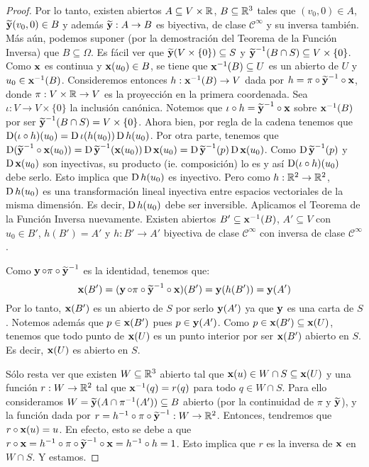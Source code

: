 \begin{prop}
\begin{proof}
Por lo tanto, existen abiertos $A\subseteq V\times\RR$, $B\subseteq\RR^3$ tales que $(v_0,0)\in A$, $\widetilde{\y}(v_0,0)\in B$ y además $\widetilde{\y}:A\to B$ es biyectiva, de clase $\mathscr{C}^\infty$ y su inversa también. Más aún, podemos suponer (por la demostración del Teorema de la Función Inversa) que $B\subseteq\Omega$. Es fácil ver que $\widetilde{\y}(V\times\{0\}) \subseteq S$ y $\widetilde{\y}^{-1}(B\cap S) \subseteq V\times\{0\}$. Como $\x$ es continua y $\x(u_0)\in B$, se tiene que $\x^{-1}(B)\subseteq U$ es un abierto de $U$ y $u_0\in\x^{-1}(B)$. Consideremos entonces $h:\x^{-1}(B)\to V$ dada por $h=\pi\circ\widetilde{\y}^{-1}\circ\x$, donde $\pi:V\times\RR\to V$ es la proyección en la primera coordenada. Sea $\iota:V\to V\times\{0\}$ la inclusión canónica. Notemos que $\iota\circ h = \widetilde{\y}^{-1}\circ\x$ sobre $\x^{-1}(B)$ por ser $\widetilde{\y}^{-1}(B\cap S) = V\times\{0\}$. Ahora bien, por regla de la cadena tenemos que $\D(\iota\circ h)(u_0)=\D\iota(h(u_0))\D h(u_0)$. Por otra parte, tenemos que $\D(\widetilde{\y}^{-1}\circ\x(u_0))=\D\widetilde{\y}^{-1}(\x(u_0))\D\x(u_0) = \D\widetilde{\y}^{-1}(p)\D\x(u_0)$. Como $\D\widetilde{\y}^{-1}(p)$ y $\D\x(u_0)$  son inyectivas, su producto (ie. composición) lo es y así $\D(\iota\circ h)(u_0)$ debe serlo. Esto implica que $\D h(u_0)$ es inyectivo. Pero como $h:\RR^2\to\RR^2$, $\D h(u_0)$ es una transformación lineal inyectiva entre espacios vectoriales de la misma dimensión. Es decir, $\D h(u_0)$ debe ser inversible. Aplicamos el Teorema de la Función Inversa nuevamente. Existen abiertos $B'\subseteq\x^{-1}(B)$, $A'\subseteq V$ con $u_0\in B'$, $h(B')=A'$ y $h:B'\to A'$ biyectiva de clase $\mathscr{C}^\infty$ con inversa de clase $\mathscr{C}^\infty$.

Como $\y\circ\pi\circ\widetilde{\y}^{-1}$ es la identidad, tenemos que: $$\x(B')=(\y\circ\pi\circ\widetilde{\y}^{-1}\circ\x)(B')=\y(h(B'))=\y(A')$$ Por lo tanto, $\x(B')$ es un abierto de $S$ por serlo $\y(A')$ ya que $\y$ es una carta de $S$. Notemos además que $p\in\x(B')$ pues $p\in\y(A')$. Como $p\in\x(B')\subseteq\x(U)$, tenemos que todo punto de $\x(U)$ es un punto interior por ser $\x(B')$ abierto en $S$. Es decir, $\x(U)$ es abierto en $S$.

Sólo resta ver que existen $W\subseteq\RR^3$ abierto tal que $\x(u)\in W\cap S\subseteq \x(U)$ y una función $r:W\to\RR^2$ tal que $\x^{-1}(q)=r(q)$ para todo $q\in W\cap S$. Para ello consideramos $W = \widetilde{\y}(A\cap\pi^{-1}(A')) \subseteq B$ abierto (por la continuidad de $\pi$ y $\widetilde{\y}$), y la función dada por $r=h^{-1}\circ\pi\circ\widetilde{\y}^{-1}:W\to\RR^2$. Entonces, tendremos que $r\circ \x(u)=u$. En efecto, esto se debe a que $r\circ\x = h^{-1}\circ\pi\circ\widetilde{\y}^{-1}\circ\x = h^{-1}\circ h = 1$. Esto implica que $r$ es la inversa de $\x$ en $W\cap S$. Y estamos.
\end{proof}
\end{prop}

